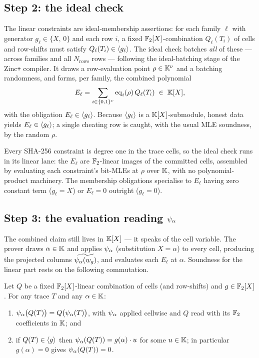 \subsection{Step 2: the ideal check}
\label{sec:ideal-check}

The linear constraints are ideal-membership assertions: for each family $\ell$
with generator $g_\ell\in\{X,\,0\}$ and each row $i$, a fixed
$\mathbb{F}_2[X]$-combination $Q_\ell(T_i)$ of cells and row-shifts must satisfy
$Q_\ell(T_i)\in\langle g_\ell \rangle$. The ideal check batches \emph{all} of these ---
across families and all $N_{\mathrm{rows}}$ rows --- following the
ideal-batching stage of the Zinc\texttt{+} compiler. It draws a row-evaluation
point $\rho\in\mathbb{K}^{\nu}$ and a batching randomness, and forms, per family, the
combined polynomial
\[
  E_\ell = \sum_{i\in\{0,1\}^{\nu}} \operatorname{eq}_i(\rho)\,Q_\ell(T_i)\;\in\;\mathbb{K}[X],
\]
with the obligation $E_\ell\in\langle g_\ell \rangle$. Because $\langle g_\ell \rangle$ is a
$\mathbb{K}[X]$-submodule, honest data yields $E_\ell\in\langle g_\ell \rangle$; a single
cheating row is caught, with the usual MLE soundness, by the random $\rho$.

\begin{remark}
\label{rem:native-ic}
Every SHA-256 constraint is degree one in the trace cells, so the ideal check
runs in its linear lane: the $E_\ell$ are $\mathbb{F}_2$-linear images of the committed
cells, assembled by evaluating each constraint's bit-MLEs at $\rho$ over $\mathbb{K}$,
with no polynomial-product machinery. The membership obligations specialise to
$E_\ell$ having zero constant term ($g_\ell = X$) or $E_\ell = 0$ outright
($g_\ell = 0$).
\end{remark}

\subsection{Step 3: the evaluation reading $\psi_{\alpha}$}
\label{sec:psi-alpha}

The combined claim still lives in $\mathbb{K}[X]$ --- it speaks of the cell variable. The
prover draws $\alpha\in\mathbb{K}$ and applies $\psi_{\alpha}$ (substitution $X = \alpha$) to
every cell, producing the projected columns $\widetilde{\psi_{\alpha}(w_g)}$, and evaluates
each $E_\ell$ at $\alpha$. Soundness for the linear part rests on the following
commutation.

\begin{lemma}
\label{lem:linear-survives}
Let $Q$ be a fixed $\mathbb{F}_2[X]$-linear combination of cells (and row-shifts) and
$g\in\mathbb{F}_2[X]$. For any trace $T$ and any $\alpha\in\mathbb{K}$:
\begin{enumerate}[leftmargin=2em,label=(\roman*)]
  \item $\psi_{\alpha}\bigl(Q(T)\bigr) = Q\bigl(\psi_{\alpha}(T)\bigr)$, with $\psi_{\alpha}$ applied
    cellwise and $Q$ read with its $\mathbb{F}_2$ coefficients in $\mathbb{K}$; and
  \item if $Q(T)\in\langle g \rangle$ then $\psi_{\alpha}(Q(T)) = g(\alpha)\cdot u$ for some
    $u\in\mathbb{K}$; in particular $g(\alpha)=0$ gives $\psi_{\alpha}(Q(T))=0$.
\end{enumerate}
\end{lemma}

